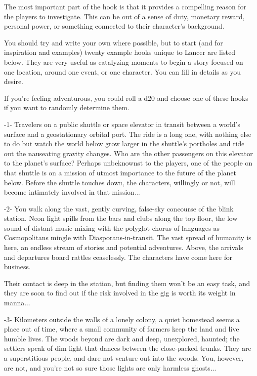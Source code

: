 The most important part of the hook is that it provides a compelling reason for the players  
to investigate. This can be out of a sense of duty, monetary reward, personal power, or  
something connected to their character’s background.
 

You should try and write your own where possible, but to start (and for inspiration and examples)  
twenty example hooks unique to Lancer are listed below. They are very useful as catalyzing  
moments to begin a story focused on one location, around one event, or one character. You can  
fill in details as you desire.
 

If you’re feeling adventurous, you could roll a d20 and choose one of these hooks if you want to  
randomly determine them.
 

                                                     -1-  
Travelers on a public shuttle or space elevator in transit between a world’s surface and a  
geostationary orbital port. The ride is a long one, with nothing else to do but watch the world  
below grow larger in the shuttle’s portholes and ride out the nauseating gravity changes. Who are  
the other passengers on this elevator to the planet’s surface? Perhaps unbeknownst to the  
players, one of the people on that shuttle is on a mission of utmost importance to the future of  
the planet below. Before the shuttle touches down, the characters, willingly or not, will become  
intimately involved in that mission...  

                                                     -2-  
You walk along the vast, gently curving, false-sky concourse of the blink station. Neon light spills  
from the bars and clubs along the top floor, the low sound of distant music mixing with the  
polyglot chorus of languages as Cosmopolitans mingle with Diasporans-in-transit. The vast  
spread of humanity is here, an endless stream of stories and potential adventures. Above, the  
arrivals and departures board rattles ceaselessly. The characters have come here for business.  

                                                                                                          


Their contact is deep in the station, but finding them won’t be an easy task, and they are soon to  
find out if the risk involved in the gig is worth its weight in manna...   

                                                     -3-  
Kilometers outside the walls of a lonely colony, a quiet homestead seems a place out of time,  
where a small community of farmers keep the land and live humble lives. The woods beyond are  
dark and deep, unexplored, haunted; the settlers speak of dim light that dances between the  
close-packed trunks. They are a superstitious people, and dare not venture out into the woods.  
You, however, are not, and you’re not so sure those lights are only harmless ghosts...  

